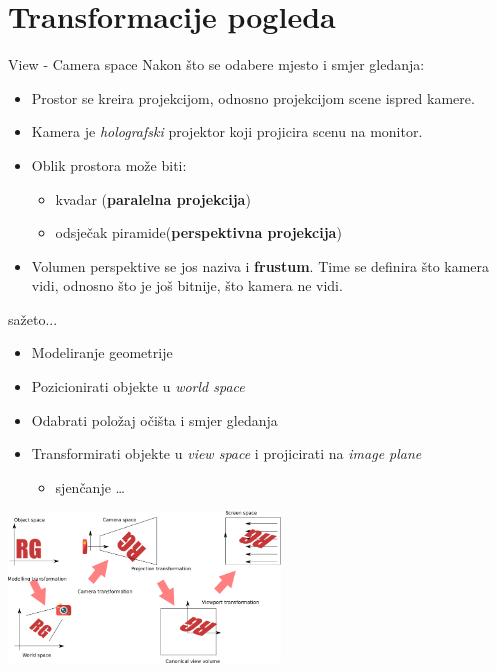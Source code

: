 \documentclass[9pt]{beamer}
\begin{document}
\section{Transformacije pogleda}
\begin{frame}{View - Camera space}
	Nakon što se odabere mjesto i smjer gledanja:
	
	\begin{itemize}
		\item Prostor se kreira projekcijom, odnosno projekcijom scene ispred kamere.
		\item Kamera je \textit{holografski} projektor koji projicira scenu na monitor.
		\item Oblik prostora može biti:
		\begin{itemize}
			\item kvadar (\textbf{paralelna projekcija})
			\item odsječak piramide(\textbf{perspektivna projekcija})  
		\end{itemize}
		\item Volumen perspektive se jos naziva  i \textbf{frustum}.
		Time se definira što kamera vidi, odnosno što je još bitnije, što kamera ne vidi.
	\end{itemize}
\end{frame}

\begin{frame}{sažeto...}
	\begin{itemize}
		\item Modeliranje geometrije
		\item Pozicionirati objekte u \textsl{world space}
		\item Odabrati položaj očišta i smjer gledanja
		\item Transformirati objekte u \textsl{view space} i projicirati na \textsl{image plane}
		\begin{itemize}
			\item sjenčanje \ldots
		\end{itemize}
	\end{itemize}
	\begin{center}
		\includegraphics[height=4cm]{slike/space_transform.png}
	\end{center}
\end{frame}
\end{document}
